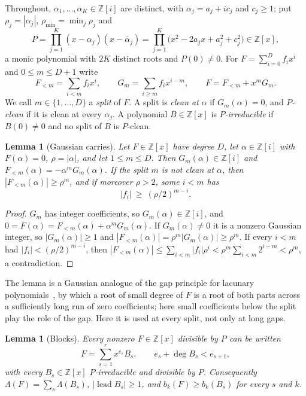 \documentclass[11pt]{article}
\newtheorem{lemma}[theorem]{Lemma}
\begin{document}
Throughout, $\alpha_1,\ldots,\alpha_K\in\mathbb Z[i]$ are distinct, with
$\alpha_j=a_j+ic_j$ and $c_j\ge1$; put $\rho_j=|\alpha_j|$,
$\rho_{\min}=\min_j\rho_j$ and
\[
  P=\prod_{j=1}^K(x-\alpha_j)(x-\bar\alpha_j)
   =\prod_{j=1}^K\bigl(x^2-2a_jx+a_j^2+c_j^2\bigr)\in\mathbb Z[x],
\]
a monic polynomial with $2K$ distinct roots and $P(0)\ne0$.  For
$F=\sum_{i=0}^Df_ix^i$ and $0\le m\le D+1$ write
\[
  F_{<m}=\sum_{i<m}f_ix^i,\qquad G_m=\sum_{i\ge m}f_ix^{i-m},\qquad
  F=F_{<m}+x^mG_m .
\]
We call $m\in\{1,\ldots,D\}$ a \emph{split} of $F$.  A split is \emph{clean
at} $\alpha$ if $G_m(\alpha)=0$, and \emph{$P$-clean} if it is clean at every
$\alpha_j$.  A polynomial $B\in\mathbb Z[x]$ is \emph{$P$-irreducible} if
$B(0)\ne0$ and no split of $B$ is $P$-clean.

\begin{lemma}[Gaussian carries]\label{lem:gausscarry}
Let $F\in\mathbb Z[x]$ have degree $D$, let $\alpha\in\mathbb Z[i]$ with
$F(\alpha)=0$, $\rho=|\alpha|$, and let $1\le m\le D$.  Then
$G_m(\alpha)\in\mathbb Z[i]$ and $F_{<m}(\alpha)=-\alpha^mG_m(\alpha)$.  If the
split $m$ is not clean at $\alpha$, then $|F_{<m}(\alpha)|\ge\rho^m$, and if
moreover $\rho>2$, some $i<m$ has
\[
  |f_i|\ \ge\ (\rho/2)^{m-i}.
\]
\end{lemma}

\begin{proof}
$G_m$ has integer coefficients, so $G_m(\alpha)\in\mathbb Z[i]$, and
$0=F(\alpha)=F_{<m}(\alpha)+\alpha^mG_m(\alpha)$.  If $G_m(\alpha)\ne0$ it is a
nonzero Gaussian integer, so $|G_m(\alpha)|\ge1$ and
$|F_{<m}(\alpha)|=\rho^m|G_m(\alpha)|\ge\rho^m$.  If every $i<m$ had
$|f_i|<(\rho/2)^{m-i}$, then
$|F_{<m}(\alpha)|\le\sum_{i<m}|f_i|\rho^i<\rho^m\sum_{i<m}2^{i-m}<\rho^m$, a
contradiction.
\end{proof}

The lemma is a Gaussian analogue of the gap principle for lacunary
polynomials~\cite{lenstra-lacunary}, by which a root of small degree of $F$
is a root of both parts across a sufficiently long run of zero coefficients;
here small coefficients below the split play the role of the gap.  Here it is used at every split,
not only at long gaps.

\begin{lemma}[Blocks]\label{lem:gaussblocks}
Every nonzero $F\in\mathbb Z[x]$ divisible by $P$ can be written
\[
  F=\sum_{s=1}^rx^{e_s}B_s,\qquad e_s+\deg B_s<e_{s+1},
\]
with every $B_s\in\mathbb Z[x]$ $P$-irreducible and divisible by $P$.
Consequently $\Lambda(F)=\sum_s\Lambda(B_s)$, $|\operatorname{lead}B_s|\ge1$,
and $b_k(F)\ge b_k(B_s)$ for every $s$ and $k$.
\end{lemma}
\end{document}
